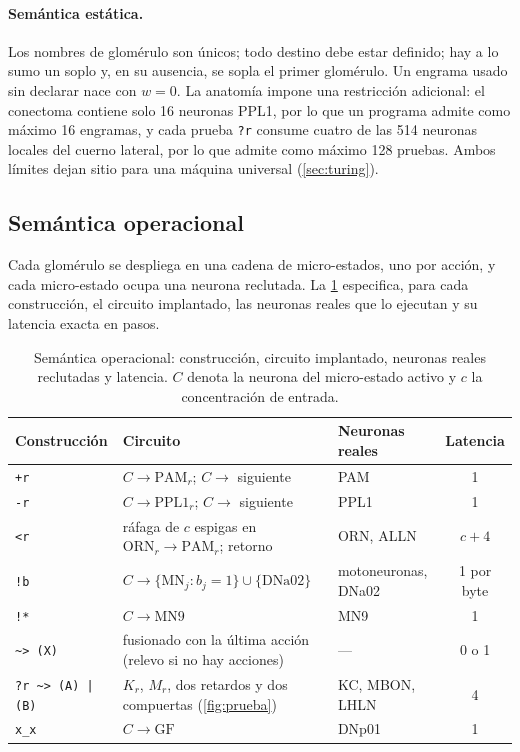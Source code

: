\documentclass[11pt,a4paper]{article}
\theoremstyle{plain}
\theoremstyle{definition}
\theoremstyle{remark}
\newcommand{\PAM}{\mathrm{PAM}}
\newcommand{\PPL}{\mathrm{PPL1}}
\newcommand{\GF}{\mathrm{GF}}
\newcommand{\ORN}{\mathrm{ORN}}
\begin{document}
\paragraph{Semántica estática.} Los nombres de glomérulo son únicos; todo
destino debe estar definido; hay a lo sumo un soplo y, en su ausencia, se
sopla el primer glomérulo. Un engrama usado sin declarar nace con $w=0$. La
anatomía impone una restricción adicional: el conectoma contiene solo 16
neuronas PPL1, por lo que un programa admite como máximo 16 engramas, y cada
prueba \texttt{?r} consume cuatro de las 514 neuronas locales del cuerno
lateral, por lo que admite como máximo 128 pruebas. Ambos límites dejan sitio
para una máquina universal (\cref{sec:turing}).

\subsection{Semántica operacional}

Cada glomérulo se despliega en una cadena de micro-estados, uno por acción,
y cada micro-estado ocupa una neurona reclutada. La \cref{tab:semantica}
especifica, para cada construcción, el circuito implantado, las neuronas
reales que lo ejecutan y su latencia exacta en pasos.

\begin{table}[t]
\centering
\caption{Semántica operacional: construcción, circuito implantado, neuronas
reales reclutadas y latencia. $C$ denota la neurona del micro-estado activo y
$c$ la concentración de entrada.}
\label{tab:semantica}
\small
\begin{tabularx}{\linewidth}{@{}l X l c@{}}
\toprule
Construcción & Circuito & Neuronas reales & Latencia \\
\midrule
\texttt{+r}        & $C\to\PAM_r$; $C\to$ siguiente & PAM & 1 \\
\texttt{-r}        & $C\to\PPL_r$; $C\to$ siguiente & PPL1 & 1 \\
\texttt{<r}        & ráfaga de $c$ espigas en $\ORN_r\to\PAM_r$; retorno & ORN, ALLN & $c+4$ \\
\texttt{!b}        & $C\to\{\mathrm{MN}_j: b_j=1\}\cup\{\mathrm{DNa02}\}$ & motoneuronas, DNa02 & 1 por byte \\
\texttt{!*}        & $C\to\mathrm{MN9}$ & MN9 & 1 \\
\texttt{\textasciitilde> (X)} & fusionado con la última acción (relevo si no hay acciones) & --- & 0 o 1 \\
\texttt{?r \textasciitilde> (A) | (B)} & $K_r$, $M_r$, dos retardos y dos compuertas (\cref{fig:prueba}) & KC, MBON, LHLN & 4 \\
\texttt{x\_x}      & $C\to\GF$ & DNp01 & 1 \\
\bottomrule
\end{tabularx}
\end{table}
\end{document}
